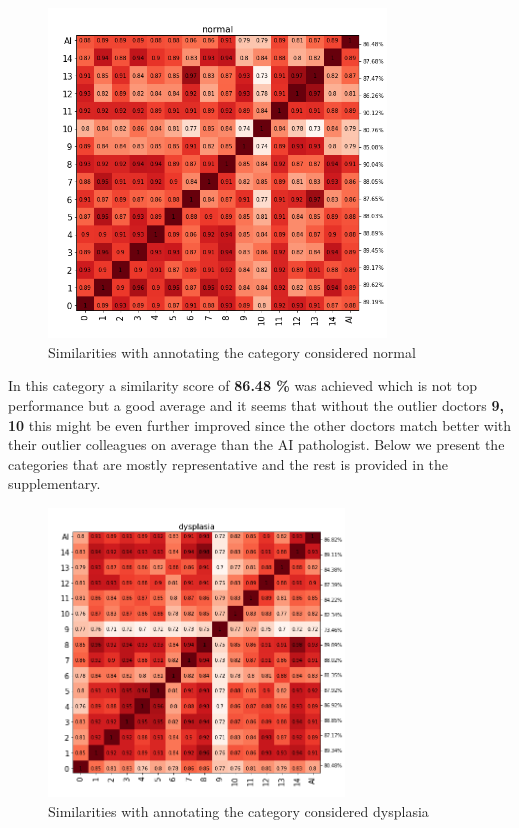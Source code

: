 \documentclass[a4paper,12pt]{article}
\begin{document}
\begin{figure}[H]
    \centering
    \includegraphics[width=0.8\textwidth]{results/similarities_normal.png}
    \caption{Similarities with annotating the category considered normal}
    \label{fig:sim_normal}
\end{figure}

\vspace{4mm}

\par In this category a similarity score of \textbf{86.48 \%} was achieved which is not top performance but a good average and it seems that without the outlier doctors \textbf{9, 10} this might be even further improved since the other doctors match better with their outlier colleagues on average than the AI pathologist. Below we present the categories that are mostly representative and the rest is provided in the supplementary.

\vspace{4mm}

\begin{figure}[H]
    \centering
    \includegraphics[width=0.7\textwidth]{results/similarities_dysplasia.png}
    \caption{Similarities with annotating the category considered dysplasia}
    \label{fig:sim_dysp}
\end{figure}
\end{document}

